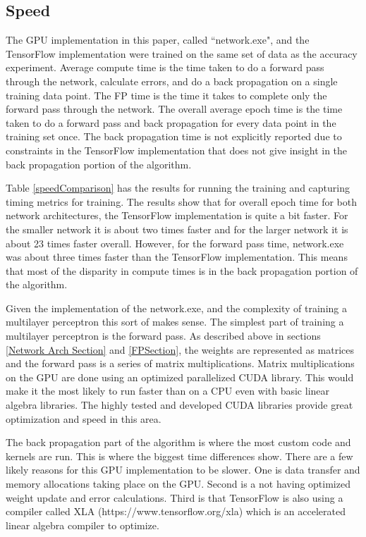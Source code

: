 \documentclass[jair, twoside,11pt,theapa]{article}
\begin{document}
\subsection{Speed}

The GPU implementation in this paper, called ``network.exe", and the TensorFlow implementation were trained on the same set of data as the accuracy experiment. 
Average compute time is the time taken to do a forward pass through the network, calculate errors, and do a back propagation on a single training data point. 
The FP time is the time it takes to complete only the forward pass through the network. 
The overall average epoch time is the time taken to do a forward pass and back propagation for every data point in the training set once. 
The back propagation time is not explicitly reported due to constraints in the TensorFlow implementation that does not give insight in the back propagation portion of the algorithm. 

Table \ref{speedComparison} has the results for running the training and capturing timing metrics for training. 
The results show that for overall epoch time for both network architectures, the TensorFlow implementation is quite a bit faster. 
For the smaller network it is about two times faster and for the larger network it is about 23 times faster overall. 
However, for the forward pass time, network.exe was about three times faster than the TensorFlow implementation. 
This means that most of the disparity in compute times is in the back propagation portion of the algorithm. 

Given the implementation of the network.exe, and the complexity of training a multilayer perceptron this sort of makes sense. 
The simplest part of training a multilayer perceptron is the forward pass. 
As described above in sections \ref{Network Arch Section} and \ref{FPSection}, the weights are represented as matrices and the forward pass is a series of matrix multiplications. 
Matrix multiplications on the GPU are done using an optimized parallelized CUDA library.
This would make it the most likely to run faster than on a CPU even with basic linear algebra libraries. 
The highly tested and developed CUDA libraries provide great optimization and speed in this area. 

The back propagation part of the algorithm is where the most custom code and kernels are run. 
This is where the biggest time differences show. 
There are a few likely reasons for this GPU implementation to be slower. 
One is data transfer and memory allocations taking place on the GPU. 
Second is a not having optimized weight update and error calculations. 
Third is that TensorFlow is also using a compiler called XLA (https://www.tensorflow.org/xla) which is an accelerated linear algebra compiler to optimize. 
\end{document}
